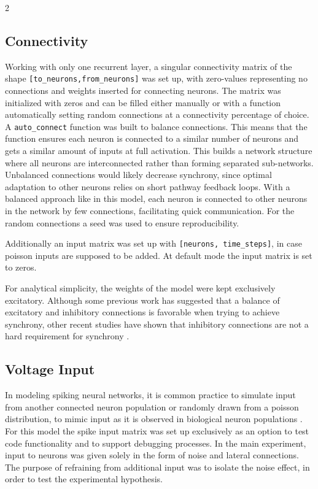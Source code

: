 \documentclass[12pt,a4paper]{article}
\begin{document}
\begin{multicols}{2}
        \subsection{Connectivity}
            Working with only one recurrent layer, a singular connectivity matrix of the shape \verb+[to_neurons,from_neurons]+ was set up, with zero-values representing no connections and weights inserted for connecting neurons. The matrix was initialized with zeros and can be filled either manually or with a function automatically setting random connections at a connectivity percentage of choice. A \verb+auto_connect+ function was built to balance connections. This means that the function ensures each neuron is connected to a similar number of neurons and gets a similar amount of inputs at full activation. This builds a network structure where all neurons are interconnected rather than forming separated sub-networks. Unbalanced connections would likely decrease synchrony, since optimal adaptation to other neurons relies on short pathway feedback loops. With a balanced approach like in this model, each neuron is connected to other neurons in the network by few connections, facilitating quick communication. For the random connections a seed was used to ensure reproducibility.
            
            Additionally an input matrix was set up with \verb+[neurons, time_steps]+, in case poisson inputs are supposed to be added. At default mode the input matrix is set to zeros.
            
            For analytical simplicity, the weights of the model were kept exclusively excitatory. Although some previous work has suggested that a balance of excitatory and inhibitory connections is favorable when trying to achieve synchrony, other recent studies have shown that inhibitory connections are not a hard requirement for synchrony \cite{M}.

        \subsection{Voltage Input}
            In modeling spiking neural networks, it is common practice to simulate input from another connected neuron population or randomly drawn from a poisson distribution, to mimic input as it is observed in biological neuron populations \cite{F, M, O}. For this model the spike input matrix was set up exclusively as an option to test code functionality and to support debugging processes. In the main experiment, input to neurons was given solely in the form of noise and lateral connections. The purpose of refraining from additional input was to isolate the noise effect, in order to test the experimental hypothesis.
            

\end{multicols}
\end{document}
